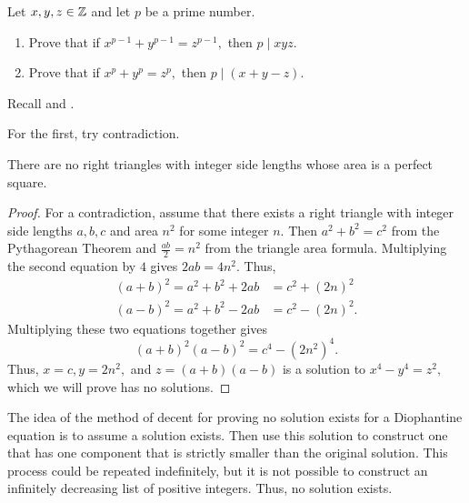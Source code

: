 \documentclass{ximera}
\begin{document}
\begin{br}
	Let $x,y,z\in\mathbb Z$ and let $p$ be a prime number.

	\begin{enumerate}
		\item Prove that if $x^{p-1}+y^{p-1}=z^{p-1},$ then $p\mid xyz.$
		\item Prove that if $x^{p}+y^{p}=z^{p},$ then $p\mid (x+y-z).$
	\end{enumerate}
	\begin{hint}
		Recall  and .
	\end{hint}

	\begin{hint}
		For the first, try contradiction.
	\end{hint}
\end{br}



\begin{theorem}\label{thm:right-tri-area}
	There are no right triangles with integer side lengths whose area is a perfect square.


	\begin{proof}
		For a contradiction, assume that there exists a right triangle with integer side lengths $a,b,c$ and area $n^2$ for some integer $n.$ Then $a^2+b^2=c^2$ from the Pythagorean Theorem and $\frac{ab}{2}=n^2$ from the triangle area formula. Multiplying the second equation by $4$ gives $2ab=4n^2.$ Thus, 
		\begin{align*}
			(a+b)^2=a^2+b^2 +2ab&=c^2+(2n)^2\\
			(a-b)^2=a^2+b^2 -2ab&=c^2-(2n)^2.
		\end{align*}
		Multiplying these two equations together gives 
		\[(a+b)^2(a-b)^2=c^4-(2n^2)^4.\]
		Thus, $x=c, y=2n^2,$ and $z=(a+b)(a-b)$ is a solution to $x^4-y^4=z^2,$ which we will prove has no solutions.
	\end{proof}
\end{theorem}




 
The idea of the method of decent for proving no solution exists for a Diophantine equation is to assume a solution exists. Then use this solution to construct one that has one component that is strictly smaller than the original solution. This process could be repeated indefinitely, but it is not possible to construct an infinitely decreasing list of positive integers. Thus, no solution exists.
 
\end{document}
